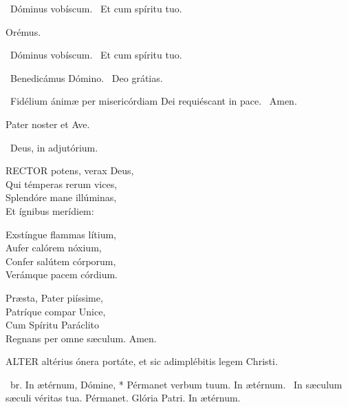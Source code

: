 \V\ Dóminus vobíscum. \R\ Et cum spíritu tuo.

Orémus.



\V\ Dóminus vobíscum. \R\ Et cum spíritu tuo.

\V\ Benedicámus Dómino. \R\ Deo grátias.

\V\ Fidélium ánimæ per misericórdiam Dei requiéscant in pace. \R\ Amen.



Pater noster et Ave.

\V\ Deus, in adjutórium.


\lettrine[lines=2]{R}{ECTOR} potens, verax Deus,\\
Qui témperas rerum vices,\\
Splendóre mane illúminas,\\
Et ígnibus merídiem:

Exstíngue flammas lítium,\\
Aufer calórem nóxium,\\
Confer salútem córporum,\\
Verámque pacem córdium.

Præsta, Pater piíssime,\\
Patríque compar Unice,\\
Cum Spíritu Paráclito\\
Regnans per omne sæculum. Amen.





\lettrine[lines=2]{A}{LTER} altérius ónera portáte, et sic adimplébitis legem Christi.

\R\ br. In ætérnum, Dómine, * Pérmanet verbum tuum. In ætérnum. \V\ In sæculum sæculi véritas tua. Pérmanet. Glória Patri. In ætérnum.

